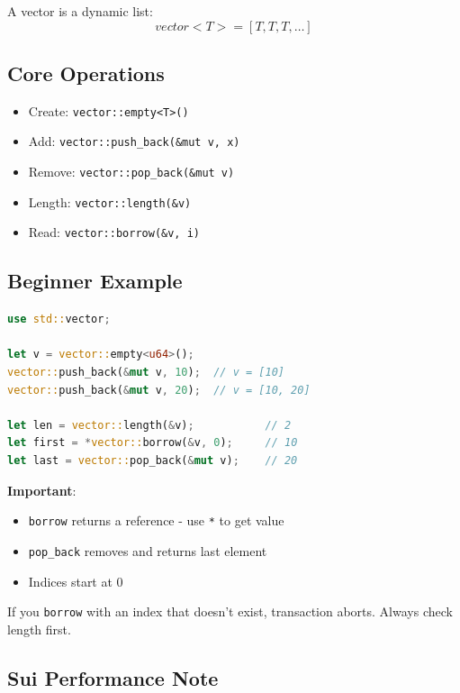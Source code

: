 \documentclass[11pt]{article}
\begin{document}
A vector is a dynamic list:
\[
vector<T> = [T, T, T, \dots]
\]

\subsection{Core Operations}

\begin{itemize}
  \item Create: \texttt{vector::empty<T>()}
  \item Add: \texttt{vector::push\_back(\&mut v, x)}
  \item Remove: \texttt{vector::pop\_back(\&mut v)}
  \item Length: \texttt{vector::length(\&v)}
  \item Read: \texttt{vector::borrow(\&v, i)}
\end{itemize}

\subsection{Beginner Example}

\begin{lstlisting}[language=Rust]
use std::vector;

let v = vector::empty<u64>();
vector::push_back(&mut v, 10);  // v = [10]
vector::push_back(&mut v, 20);  // v = [10, 20]

let len = vector::length(&v);           // 2
let first = *vector::borrow(&v, 0);     // 10
let last = vector::pop_back(&mut v);    // 20
\end{lstlisting}

\begin{noteBox}
\textbf{Important}:
\begin{itemize}
  \item \texttt{borrow} returns a reference - use \texttt{*} to get value
  \item \texttt{pop\_back} removes and returns last element
  \item Indices start at 0
\end{itemize}
\end{noteBox}

\begin{warnBox}
If you \texttt{borrow} with an index that doesn't exist, transaction aborts. Always check length first.
\end{warnBox}

\subsection{Sui Performance Note}
\end{document}
